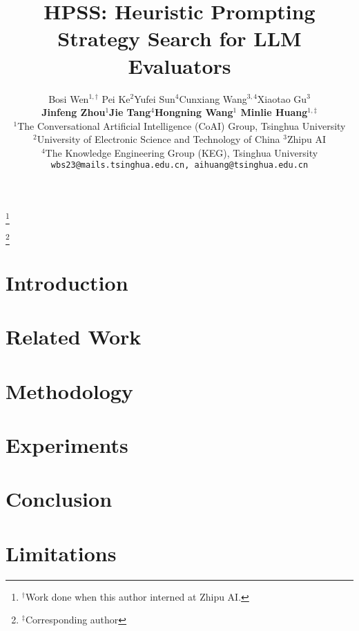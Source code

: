 \documentclass[11pt]{article}
\title{\textsc{HPSS}: Heuristic Prompting Strategy Search for LLM Evaluators}
\author{Bosi Wen$^{1,\dagger}$ \quad Pei Ke$^{2}$\quad Yufei Sun$^{4}$\quad Cunxiang Wang$^{3,4}$\quad Xiaotao Gu$^{3}$ \\
\textbf{Jinfeng Zhou$^{1}$\quad  Jie Tang$^{4}$\quad Hongning Wang$^{1}$ \quad Minlie Huang$^{1,\ddagger}$} \\
$^1$The Conversational Artificial Intelligence (CoAI) Group, Tsinghua University \\
$^2$University of Electronic Science and Technology of China \quad $^3$Zhipu AI \\
$^4$The Knowledge Engineering Group (KEG), Tsinghua University \\
\tt\small wbs23@mails.tsinghua.edu.cn, aihuang@tsinghua.edu.cn \\}
\newcommand{\blanksymbolfootnote}[1]{%
  \renewcommand{\thefootnote}{}%
  \footnote{#1}%
  \setcounter{footnote}{0} %
  \renewcommand{\thefootnote}{\arabic{footnote}}%
}
\begin{document}
\maketitle

\blanksymbolfootnote{$^\dagger$Work done when this author interned at Zhipu AI.}
\blanksymbolfootnote{$^\ddagger$Corresponding author}

\vspace{-6mm}
\begin{abstract}

\end{abstract}

\section{Introduction}


\section{Related Work}


\section{Methodology}


\section{Experiments}
\label{sec:experiments}


\section{Conclusion}


\section{Limitations}





\appendix


\end{document}
